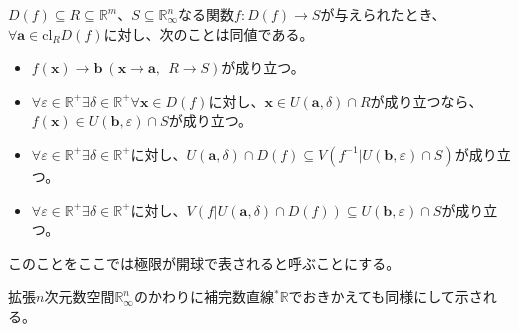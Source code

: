 \documentclass[dvipdfmx]{jsarticle}
\begin{document}
\begin{thm}[極限が開球で表される]\label{4.1.10.5}
$D(f) \subseteq R \subseteq \mathbb{R}^{m}$、$S \subseteq \mathbb{R}_{\infty}^{n}$なる関数$f:D(f) \rightarrow S$が与えられたとき、$\forall\mathbf{a} \in \mathrm{cl}_{R}{D(f)}$に対し、次のことは同値である。
\begin{itemize}
\item
  $f\left( \mathbf{x} \right) \rightarrow \mathbf{b}\ \left( \mathbf{x} \rightarrow \mathbf{a},\ \ R \rightarrow S \right)$が成り立つ。
\item
  $\forall\varepsilon \in \mathbb{R}^{+}\exists\delta \in \mathbb{R}^{+}\forall\mathbf{x} \in D(f)$に対し、$\mathbf{x} \in U\left( \mathbf{a},\delta \right) \cap R$が成り立つなら、$f\left( \mathbf{x} \right) \in U\left( \mathbf{b},\varepsilon \right) \cap S$が成り立つ。
\item
  $\forall\varepsilon \in \mathbb{R}^{+}\exists\delta \in \mathbb{R}^{+}$に対し、$U\left( \mathbf{a},\delta \right) \cap D(f) \subseteq V\left( f^{- 1}|U\left( \mathbf{b},\varepsilon \right) \cap S \right)$が成り立つ。
\item
  $\forall\varepsilon \in \mathbb{R}^{+}\exists\delta \in \mathbb{R}^{+}$に対し、$V\left( f|U\left( \mathbf{a},\delta \right) \cap D(f) \right) \subseteq U\left( \mathbf{b},\varepsilon \right) \cap S$が成り立つ。
\end{itemize}
このことをここでは極限が開球で表されると呼ぶことにする。\par
拡張$n$次元数空間$\mathbb{R}_{\infty}^{n}$のかわりに補完数直線${}^{*}\mathbb{R}$でおきかえても同様にして示される。
\end{thm}
\end{document}
